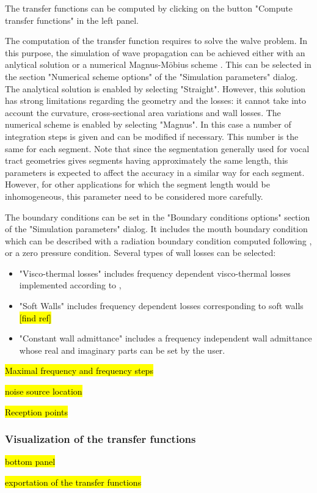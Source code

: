 \documentclass[]{article}
\begin{document}
	The transfer functions can be computed by clicking on the button 
	"Compute transfer functions" in the left panel.
	
	The computation of the transfer function requires to solve the 
	walve problem. In this purpose, the simulation of wave propagation can be achieved either with an anlytical 
	solution \cite{blandin2015effects} or a numerical Magnus-Möbius 
	scheme \cite{PAGNEUX20101834}.
	This can be selected in the section "Numerical scheme options" of
	the "Simulation parameters" dialog. The analytical solution is 
	enabled by selecting "Straight". However, this solution has strong limitations regarding the geometry and the losses: it cannot take into account the curvature, cross-sectional area variations and 
	wall losses. The numerical scheme is enabled by selecting "Magnus".
	In this case a number of integration steps is given and can be 
	modified if necessary. This number is the same for each segment.
	Note that since the segmentation generally used for vocal tract geometries gives segments having approximately the same length, 
	this parameters is expected to affect the accuracy in a similar way
	for each segment. However, for other applications for which the 
	segment length would be inhomogeneous, this parameter need to be considered more carefully.
	
	The boundary conditions can be set in the "Boundary conditions options" section of the "Simulation parameters" dialog. 
	It includes the mouth boundary condition which can be described
	with a radiation boundary condition computed following 
	\textcite{blandin2019multimodal},
	or a zero pressure condition.
	Several types of wall losses can be selected: 
	\begin{itemize}
		\item "Visco-thermal losses" includes frequency dependent 
		visco-thermal losses implemented according to 
		\textcite{bruneau1987boundary},
		\item "Soft Walls" includes frequency dependent losses 
		corresponding to soft walls \hl{[find ref]}
		\item "Constant wall admittance" includes a frequency
		independent wall admittance whose real and imaginary parts 
		can be set by the user.
	\end{itemize}

	\hl{Maximal frequency and frequency steps}
	
	\hl{noise source location}
	
	\hl{Reception points}
	
	\subsubsection{Visualization of the transfer functions}
	
	\hl{bottom panel}
	
	\hl{exportation of the transfer functions}
	
	\printbibliography
%	
%	
\end{document}
